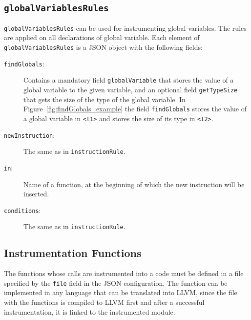 \subsection{\texttt{globalVariablesRules}}

\texttt{globalVariablesRules} can be used for instrumenting global
variables. The rules are applied on all declarations of global variable. Each
element of \texttt{globalVariablesRules} is a JSON object with the following
fields:
\begin{description}
    \item[\texttt{findGlobals}:] Contains a mandatory field
    \texttt{globalVariable} that stores the value of a global variable to the
    given variable, and an optional field \texttt{getTypeSize} that gets the
    size of the type of the global variable. In
    Figure~\ref{fig:findGlobals_example} the field \texttt{findGlobals} stores
    the value of a global variable in \texttt{<t1>} and stores the
    size of its type in \texttt{<t2>}.

    \begin{minipage}{\linewidth}
        
        \label{fig:findGlobals_example}
      \end{minipage}

    \item[\texttt{newInstruction}:] The same as in \texttt{instructionRule}.
    \item[\texttt{in}:] Name of a function, at the beginning of which the new
    instruction will be inserted.
    \item[\texttt{conditions}:] The same as in \texttt{instructionRule}.
\end{description}

\subsection{Instrumentation Functions}

The functions whose calls are instrumented into a code must be defined in a
file specified by the \texttt{file} field in the JSON configuration. The
function can be implemented in any language that can be translated into LLVM,
since the file with the functions is compiled to LLVM first and after a
successful instrumentation, it is linked to the instrumented module.

